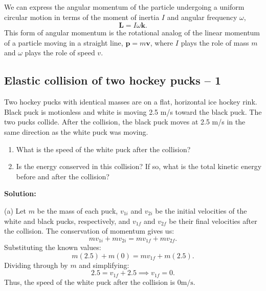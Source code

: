 \documentclass[12pt]{article}
\begin{document}
We can express the angular momentum of the particle undergoing a uniform circular motion in terms of the moment of inertia $I$ and angular frequency $\omega$,
\begin{equation}
    \mathbf{L} = I \omega \mathbf{k}.
\end{equation}
This form of angular momentum is the rotational analog of the linear momentum of a particle moving in a straight line, $\mathbf{p} = m \mathbf{v}$, where $I$ plays the role of mass $m$ and $\omega$ plays the role of speed $v$.

\subsection{Elastic collision of two hockey pucks -- 1}

Two hockey pucks with identical masses are on a flat, horizontal ice hockey rink. Black puck is motionless and white is moving 2.5 m/s toward the black puck. The two pucks collide. After the collision, the black puck moves at 2.5 m/s in the same direction as the white puck was moving. 

\begin{enumerate}
    \item [(a)] What is the speed of the white puck after the collision?
    \item [(b)] Is the energy conserved in this collision? If so, what is the total kinetic energy before and after the collision?
\end{enumerate}

\textbf{Solution:} 

(a) Let $m$ be the mass of each puck, $v_{1i}$ and $v_{2i}$ be the initial velocities of the white and black pucks, respectively, and $v_{1f}$ and $v_{2f}$ be their final velocities after the collision. The conservation of momentum gives us:
\begin{equation}
m v_{1i} + m v_{2i} = m v_{1f} + m v_{2f}.
\end{equation}
Substituting the known values:
\begin{equation}
m (2.5) + m (0) = m v_{1f} + m (2.5).
\end{equation}
Dividing through by $m$ and simplifying:
\begin{equation}
2.5 = v_{1f} + 2.5 \implies v_{1f} = 0.
\end{equation}
Thus, the speed of the white puck after the collision is $\boxed{0 \text{m/s}}$.
\end{document}
